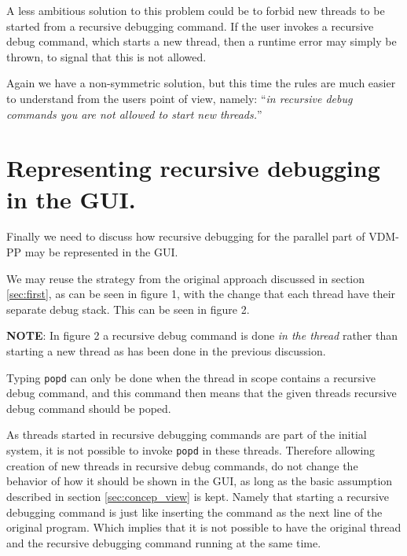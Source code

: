 \documentclass[]{article}
\begin{document}
A less ambitious solution to this problem could be to forbid new threads to
be started from a recursive debugging command. If the user invokes a
recursive debug command, which starts a new thread, then a runtime error
may simply be thrown, to signal that this is not allowed.

Again we have a non-symmetric solution, but this time the rules are much
easier to understand from the users point of view, namely: ``\emph{in
recursive debug commands you are not allowed to start new threads.}''

\section{Representing recursive debugging in the GUI.}
Finally we need to discuss how recursive debugging for the parallel part of
VDM-PP may be represented in the GUI. 

We may reuse the strategy from the original approach discussed in section
\ref{sec:first}, as can be seen in figure 1, with the change that each
thread have their separate debug stack. This can be seen in figure 2.

\textbf{NOTE}: In figure 2 a recursive debug command is done \emph{in the
thread} rather than starting a new thread as has been done in the previous
discussion.

Typing \texttt{popd} can only be done when the thread in scope contains a
recursive debug command, and this command then means that the given threads
recursive debug command should be poped.

As threads started in recursive debugging commands are part of the initial
system, it is not possible to invoke \texttt{popd} in these
threads. Therefore allowing creation of new threads in recursive debug
commands, do not change the behavior of how it should be shown in the GUI,
as long as the basic assumption described in section \ref{sec:concep_view}
is kept. Namely that starting a recursive debugging command is just like
inserting the command as the next line of the original program. Which
implies that it is not possible to have the original thread and the
recursive debugging command running at the same time.
\end{document}
